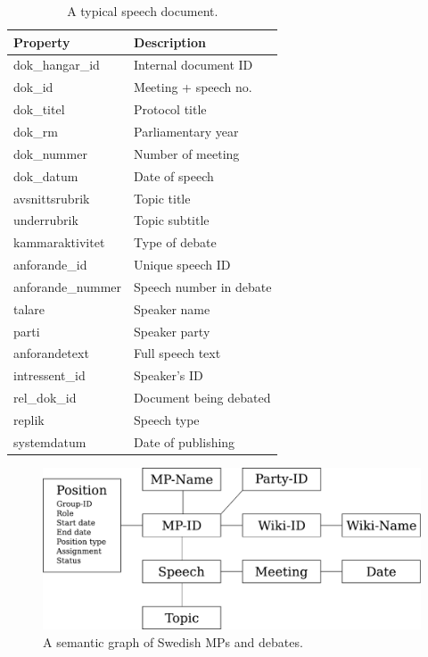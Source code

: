 \begin{table}[t!]
\begin{center}
\begin{tabular}{|l|l|}
\hline \textbf{Property} & \textbf{Description} \\ \hline
dok\_hangar\_id & Internal document ID \\
dok\_id  & Meeting + speech no. \\
dok\_titel & Protocol title \\
dok\_rm & Parliamentary year \\
dok\_nummer & Number of meeting \\
dok\_datum & Date of speech \\
avsnittsrubrik & Topic title \\
underrubrik & Topic subtitle \\
kammaraktivitet & Type of debate \\
anforande\_id & Unique speech ID \\
anforande\_nummer & Speech number in debate \\
talare & Speaker name \\
parti & Speaker party \\
anforandetext & Full speech text \\
intressent\_id & Speaker's ID \\
rel\_dok\_id & Document being debated \\
replik & Speech type \\
systemdatum & Date of publishing \\
\hline
\end{tabular}
\end{center}
\caption{\label{poli-anf-table} A typical speech document. }
\end{table}

\begin{figure}
 \centering 
 \includegraphics[width=12cm]{images/graph-drawing.pdf}
 \caption{\label{mp-graph} A semantic graph of Swedish MPs and debates.}
\end{figure}

